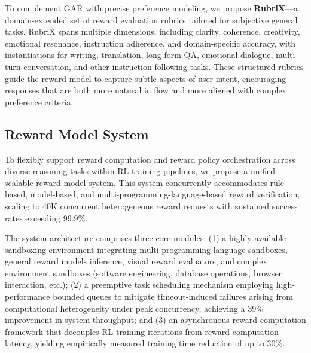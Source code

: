 \documentclass[table]{gtech}
\theoremstyle{definition}
\begin{document}
To complement GAR with precise preference modeling, we propose \textbf{RubriX}—a domain-extended set of reward evaluation rubrics tailored for subjective general tasks. 
RubriX spans multiple dimensions, including clarity, coherence, creativity, emotional resonance, instruction adherence, and domain-specific accuracy, with instantiations for writing, translation, long-form QA, emotional dialogue, multi-turn conversation, and other instruction-following tasks. 
These structured rubrics guide the reward model to capture subtle aspects of user intent, encouraging responses that are both more natural in flow and more aligned with complex preference criteria.

\subsection{Reward Model System}
To flexibly support reward computation and reward policy orchestration across diverse reasoning tasks within RL training pipelines, we propose a unified scalable reward model system. This system concurrently accommodates rule-based, model-based, and multi-programming-language-based reward verification, scaling to 40K concurrent heterogeneous reward requests with sustained success rates exceeding 99.9\%.

The system architecture comprises three core modules: (1) a highly available sandboxing environment integrating multi-programming-language sandboxes, general reward models inference, visual reward evaluators, and complex environment sandboxes (software engineering, database operations, browser interaction, etc.); (2) a preemptive task scheduling mechanism employing high-performance bounded queues to mitigate timeout-induced failures arising from computational heterogeneity under peak concurrency, achieving a 39\% improvement in system throughput; and (3) an asynchronous reward computation framework that decouples RL training iterations from reward computation latency, yielding empirically measured training time reduction of up to 30\%.
\end{document}
